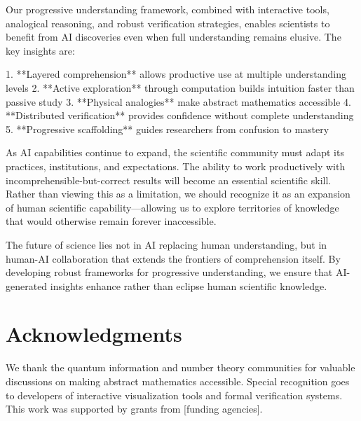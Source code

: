 \documentclass[11pt,a4paper]{article}
\begin{document}
Our progressive understanding framework, combined with interactive tools, analogical reasoning, and robust verification strategies, enables scientists to benefit from AI discoveries even when full understanding remains elusive. The key insights are:

1. **Layered comprehension** allows productive use at multiple understanding levels
2. **Active exploration** through computation builds intuition faster than passive study  
3. **Physical analogies** make abstract mathematics accessible
4. **Distributed verification** provides confidence without complete understanding
5. **Progressive scaffolding** guides researchers from confusion to mastery

As AI capabilities continue to expand, the scientific community must adapt its practices, institutions, and expectations. The ability to work productively with incomprehensible-but-correct results will become an essential scientific skill. Rather than viewing this as a limitation, we should recognize it as an expansion of human scientific capability—allowing us to explore territories of knowledge that would otherwise remain forever inaccessible.

The future of science lies not in AI replacing human understanding, but in human-AI collaboration that extends the frontiers of comprehension itself. By developing robust frameworks for progressive understanding, we ensure that AI-generated insights enhance rather than eclipse human scientific knowledge.

\section*{Acknowledgments}

We thank the quantum information and number theory communities for valuable discussions on making abstract mathematics accessible. Special recognition goes to developers of interactive visualization tools and formal verification systems. This work was supported by grants from [funding agencies].
\end{document}

